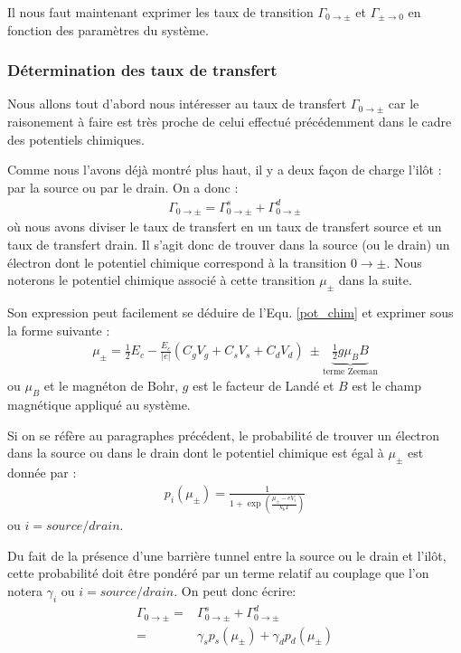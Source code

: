 Il nous faut maintenant exprimer les taux de transition $\Gamma_{0 \rightarrow \pm}$ et $\Gamma_{\pm \rightarrow 0}$ en fonction des paramètres du système. 

\subsubsection{Détermination des taux de transfert}
Nous allons tout d'abord nous intéresser au taux de transfert $\Gamma_{0 \rightarrow \pm}$ car le raisonement à faire est très proche de celui effectué précédemment dans le cadre des potentiels chimiques. 

Comme nous l'avons déjà montré plus haut, il y a deux façon de charge l'ilôt : par la source ou par le drain. On a donc :
\begin{eqnarray}
\Gamma_{0 \rightarrow \pm} = \Gamma_{0 \rightarrow \pm}^s + \Gamma_{0 \rightarrow \pm}^d
\end{eqnarray}
où nous avons diviser le taux de transfert en un taux de transfert source et un taux de transfert drain. Il s'agit donc de trouver dans la source (ou le drain) un électron dont le potentiel chimique correspond à la transition $0\rightarrow \pm$. Nous noterons le potentiel chimique associé à cette transition $\mu_{\pm}$ dans la suite. 

Son expression peut facilement se déduire de l'Equ. \ref{pot_chim} et exprimer sous la forme suivante :
\begin{eqnarray}
\mu_{\pm} = \frac{1}{2}E_c - \frac{E_c}{|e|}(C_gV_g + C_sV_s + C_dV_d)~ \pm \underbrace{ \frac{1}{2}g \mu_B B}_{\text{terme Zeeman}}
\end{eqnarray}
ou  $\mu_B$ et le magnéton de Bohr, $g$ est le facteur de Landé et $B$ est le champ magnétique appliqué au système.

Si on se réfère au paragraphes précédent, le probabilité de trouver un électron dans la source ou dans le drain dont le potentiel chimique est égal à $\mu_{\pm}$ est donnée par :
\begin{eqnarray}
p_i(\mu_\pm) = \frac{1}{1 + \exp{(\frac{\mu_\pm - eV_i}{k_bT})}}
\end{eqnarray}
ou $i=source/drain$. 

Du fait de la présence d'une barrière tunnel entre la source ou le drain et l'ilôt, cette probabilité doit être pondéré par un terme relatif au couplage que l'on notera $\gamma_i$ ou $i=source/drain$.
On peut donc écrire:
\begin{eqnarray}
\Gamma_{0 \rightarrow \pm} =& \Gamma_{0 \rightarrow \pm}^s + \Gamma_{0 \rightarrow \pm}^d  \nonumber \\
 =& \gamma_s p_s(\mu_\pm) + \gamma_d p_d(\mu_\pm)
\end{eqnarray}

